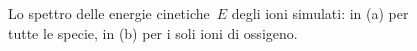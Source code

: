 \begin{figure} [!p]
	\centering
	
	\caption{Lo spettro delle energie cinetiche~$E$ degli ioni simulati: in (a) per tutte le specie, in (b) per i soli ioni di ossigeno.} \label{fig:KinE}
\end{figure}

